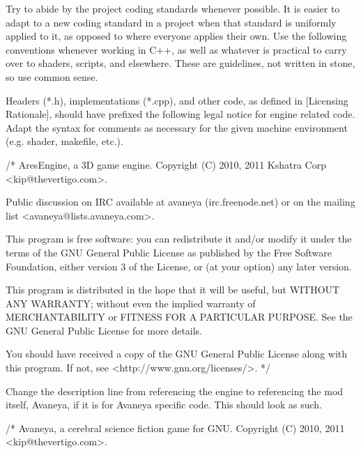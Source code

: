 

Try to abide by the project coding standards whenever possible. It is easier to adapt to a new coding standard in a project when that standard is uniformly applied to it, as opposed to where everyone applies their own. Use the following conventions whenever working in C++, as well as whatever is practical to carry over to shaders, scripts, and elsewhere. These are guidelines, not written in stone, so use common sense.

Headers (*.h), implementations (*.cpp), and other code, as defined in [Licensing Rationale], should have prefixed the following legal notice for engine related code. Adapt the syntax for comments as necessary for the given machine environment (e.g. shader, makefile, etc.).

\StartCodeExample
\starttyping
/*
    AresEngine, a 3D game engine.
    Copyright (C) 2010, 2011 Kshatra Corp <kip@thevertigo.com>.

    Public discussion on IRC available at \type{#}avaneya (irc.freenode.net)
    or on the mailing list <avaneya@lists.avaneya.com>.

    This program is free software: you can redistribute it and/or modify
    it under the terms of the GNU General Public License as published by
    the Free Software Foundation, either version 3 of the License, or
    (at your option) any later version.

    This program is distributed in the hope that it will be useful,
    but WITHOUT ANY WARRANTY; without even the implied warranty of
    MERCHANTABILITY or FITNESS FOR A PARTICULAR PURPOSE.  See the
    GNU General Public License for more details.

    You should have received a copy of the GNU General Public License
    along with this program.  If not, see <http://www.gnu.org/licenses/>.
*/
\stoptyping
\StopCodeExample

Change the description line from referencing the engine to referencing the mod itself, Avaneya, if it is for Avaneya specific code. This should look as such.

\StartCodeExample
\starttyping
/*
    Avaneya, a cerebral science fiction game for GNU.
    Copyright (C) 2010, 2011 <kip@thevertigo.com>.

